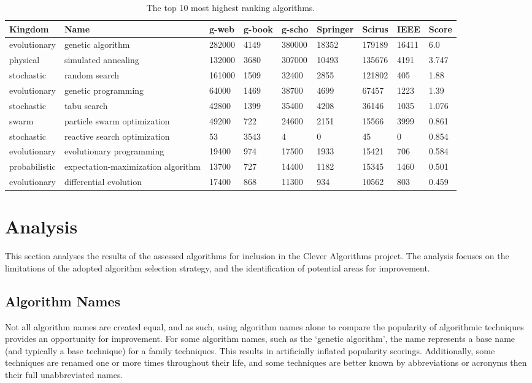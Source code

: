 \documentclass[a4paper, 11pt]{article}
\begin{document}
\begin{table}[htp]
	\centering\footnotesize
		\begin{tabularx}{\textwidth}{lXlllllll}
		\toprule
		\textbf{Kingdom} & \textbf{Name} & \textbf{g-web} & \textbf{g-book} & \textbf{g-scho} & \textbf{Springer} & \textbf{Scirus} & \textbf{IEEE} & \textbf{Score} \\ 
		\toprule
		evolutionary & genetic algorithm & 282000 & 4149 & 380000 & 18352 & 179189 & 16411 & 6.0 \\
		physical & simulated annealing & 132000 & 3680 & 307000 & 10493 & 135676 & 4191 & 3.747 \\
		stochastic & random search & 161000 & 1509 & 32400 & 2855 & 121802 & 405 & 1.88 \\
		evolutionary & genetic programming & 64000 & 1469 & 38700 & 4699 & 67457 & 1223 & 1.39 \\
		stochastic & tabu search & 42800 & 1399 & 35400 & 4208 & 36146 & 1035 & 1.076 \\
		swarm & particle swarm optimization & 49200 & 722 & 24600 & 2151 & 15566 & 3999 & 0.861 \\
		stochastic & reactive search optimization & 53 & 3543 & 4 & 0 & 45 & 0 & 0.854 \\
		evolutionary & evolutionary programming & 19400 & 974 & 17500 & 1933 & 15421 & 706 & 0.584 \\
		probabilistic & expectation-maximization algorithm & 13700 & 727 & 14400 & 1182 & 15345 & 1460 & 0.501 \\
		evolutionary & differential evolution & 17400 & 868 & 11300 & 934 & 10562 & 803 & 0.459 \\
		\bottomrule
		\end{tabularx}	
	\caption{The top 10 most highest ranking algorithms.}
	\label{tab:top}
\end{table}

% 
% 
\section{Analysis}
\label{sec:analysis}
This section analyses the results of the assessed algorithms for inclusion in the Clever Algorithms project. The analysis focuses on the limitations of the adopted algorithm selection strategy, and the identification of potential areas for improvement.

\subsection{Algorithm Names}
Not all algorithm names are created equal, and as such, using algorithm names alone to compare the popularity of algorithmic techniques provides an opportunity for improvement. For some algorithm names, such as the `genetic algorithm', the name represents a base name (and typically a base technique) for a family techniques. This results in artificially inflated popularity scorings. Additionally, some techniques are renamed one or more times throughout their life, and some techniques are better known by abbreviations or acronyms then their full unabbreviated names.
\end{document}

